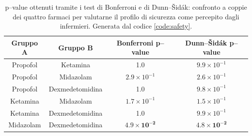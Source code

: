 \bgroup
\def\arraystretch{1.5}
\begin{table}[!h]
    \centering
    \begin{tabular}{c|c|c|c}
         Gruppo A & Gruppo B & Bonferroni p--value & Dunn--Šidák p--value\\ \hline
       Propofol & Ketamina & 1.0 & $9.9 \times 10^{-1}$ \\
       Propofol & Midazolam  & $2.9 \times 10^{-1}$ & $2.6 \times 10^{-1}$\\
       Propofol & Dexmedetomidina & 1.0 & $9.8 \times 10^{-1}$\\
       Ketamina & Midazolam & $1.7\times10^{-1}$ & $1.5\times10^{-1}$\\
       Ketamina & Dexmedetomidina & 1.0 & $9.9\times10^{-1}$\\
       Midazolam & Dexmedetomidina & $\mathbf{4.9 \times 10^{-2}}$ & $\mathbf{4.8 \times 10^{-2}}$\\
       
    \end{tabular}
    \caption{p--value ottenuti tramite i test di Bonferroni e di Dunn--Šidák: confronto a coppie dei quattro farmaci per valutarne il profilo di sicurezza come percepito dagli infermieri. Generata dal codice \ref{code:safety}.}
    \label{tab:sicurezzatest}
\end{table}
\egroup

\vfill

